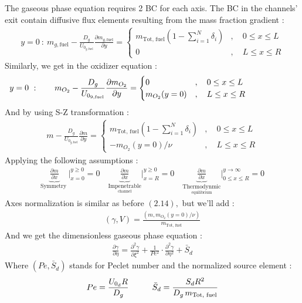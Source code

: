 \documentclass[12pt]{article}
\newcommand\tab[1][1cm]{\hspace*{#1}}
\numberwithin{equation}{section}
\begin{document}
\begin{flushleft}
The gaseous phase equation requires 2 BC for each axis. The {BC} in the channels' exit contain diffusive flux elements resulting from the mass fraction gradient :
\begin{align} 
y=0 \ : \ m_{g, \text{fuel}}-\frac{D_{g}}{U_{0_{g,  \text{fuel}}}} \frac{\partial m_{g,{\text{fuel}}}}{\partial y}= \begin{cases}
m_{\text{Tot, fuel}}\left(1-\sum_{i=1}^{N} \delta_{i}\right) & , \quad 0 \leq x \leq L \\
0 & , \quad L \leq x \leq R
\end{cases}
\end{align}
Similarly, we get in the oxidizer equation :
\begin{align} 
y=0 \ :  \hspace{7mm} m_{O_{2}}-\frac{D_{g}}{U_{0_{9,\text{fuel}}} } \frac{\partial m_{O_{2}}}{\partial y}=\begin{cases}
0 & , \quad 0 \leq x \leq L \\
m_{O_{2}}(y=0) & , \quad L \leq x \leq R
\end{cases}  \hspace{21mm}
\end{align}
And by using S-Z transformation :
\begin{align} 
m-\frac{D_{g}}{U_{0_{g,\text{fuel}}}} \frac{\partial m}{\partial y}= \begin{cases}
m_{ \text{Tot, fuel}}\left(1-\sum_{i=1}^{N} \delta_{i}\right) & , \quad 0 \leq x \leq L \\
-m_{O_{2}}(y=0) / \nu & , \quad L \leq x \leq R 
\end{cases}
\end{align} 
Applying the following assumptions :
\begin{align} 
\underbrace{\frac{\partial m}{\partial x}}_{\text {Symmetry }}\bigg|_{x=0} ^{y \geq 0}=0 \quad \underbrace{\frac{\partial m}{\partial x}}_{  \underset{\text {channel}}{\text{Impenetrable}}} \bigg|_{x=R} ^{y \geq 0}= 0 \quad \underbrace{\frac{\partial m}{\partial x}}_{  \underset{\text {equilibrium}}{\text{Thermodynmic}}} \bigg|_{0 \leq x \leq R} ^{y \rightarrow \infty}=0
\end{align} 
Axes normalization is similar as before $(2.14),$ but we'll add :
\begin{align} 
(\gamma, V)=\frac{\left(m, m_{O_{2}}(y=0) / \nu\right)}{m_{\text{Tot, fuel}}}
\end{align} 
And we get the dimensionless gaseous phase equation :
\begin{align} 
\frac{\partial \gamma}{\partial \eta}=\frac{\partial^{2} \gamma}{\partial \xi^{2}}+\frac{1}{P e^{2}} \cdot \frac{\partial^{2} \gamma}{\partial \eta^{2}}+\bar{S}_{d}
\end{align} 
Where $\left(P e, \bar{S}_{d}\right)$ stands for Peclet number and the normalized source element :
\begin{align} 
P e=\frac{U_{0_{d}} R}{D_{g}} \tab \bar{S}_{d}=\frac{S_{d} R^{2}}{D_{g}\, m_{ \text{Tot, fuel}}}
\end{align} 


\end{flushleft}
\end{document}
